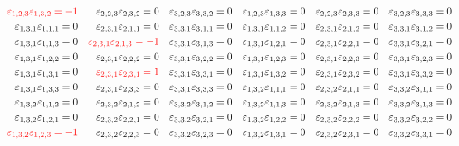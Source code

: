 \documentclass[12pt]{article}
\begin{document}
\begin{equation}
\begin{aligned}
&&{\color{red}\varepsilon_{1,2,3}\varepsilon_{1,3,2}=-1}
&&\varepsilon_{2,2,3}\varepsilon_{2,3,2}=0&&\varepsilon_{3,2,3}\varepsilon_{3,3,2}=0&&\varepsilon_{1,2,3}\varepsilon_{1,3,3}=0&&\varepsilon_{2,2,3}\varepsilon_{2,3,3}=0&&\varepsilon_{3,2,3}\varepsilon_{3,3,3}=0\\
&&\varepsilon_{1,3,1}\varepsilon_{1,1,1}=0&&\varepsilon_{2,3,1}\varepsilon_{2,1,1}=0&&\varepsilon_{3,3,1}\varepsilon_{3,1,1}=0&&\varepsilon_{1,3,1}\varepsilon_{1,1,2}=0&&\varepsilon_{2,3,1}\varepsilon_{2,1,2}=0&&\varepsilon_{3,3,1}\varepsilon_{3,1,2}=0\\
&&\varepsilon_{1,3,1}\varepsilon_{1,1,3}=0&&{\color{red}\varepsilon_{2,3,1}\varepsilon_{2,1,3}=-1}
&&\varepsilon_{3,3,1}\varepsilon_{3,1,3}=0&&\varepsilon_{1,3,1}\varepsilon_{1,2,1}=0&&\varepsilon_{2,3,1}\varepsilon_{2,2,1}=0&&\varepsilon_{3,3,1}\varepsilon_{3,2,1}=0\\
&&\varepsilon_{1,3,1}\varepsilon_{1,2,2}=0&&\varepsilon_{2,3,1}\varepsilon_{2,2,2}=0&&\varepsilon_{3,3,1}\varepsilon_{3,2,2}=0&&\varepsilon_{1,3,1}\varepsilon_{1,2,3}=0&&\varepsilon_{2,3,1}\varepsilon_{2,2,3}=0&&\varepsilon_{3,3,1}\varepsilon_{3,2,3}=0\\
&&\varepsilon_{1,3,1}\varepsilon_{1,3,1}=0&&{\color{red}\varepsilon_{2,3,1}\varepsilon_{2,3,1}=1}
&&\varepsilon_{3,3,1}\varepsilon_{3,3,1}=0&&\varepsilon_{1,3,1}\varepsilon_{1,3,2}=0&&\varepsilon_{2,3,1}\varepsilon_{2,3,2}=0&&\varepsilon_{3,3,1}\varepsilon_{3,3,2}=0\\
&&\varepsilon_{1,3,1}\varepsilon_{1,3,3}=0&&\varepsilon_{2,3,1}\varepsilon_{2,3,3}=0&&\varepsilon_{3,3,1}\varepsilon_{3,3,3}=0&&\varepsilon_{1,3,2}\varepsilon_{1,1,1}=0&&\varepsilon_{2,3,2}\varepsilon_{2,1,1}=0&&\varepsilon_{3,3,2}\varepsilon_{3,1,1}=0\\
&&\varepsilon_{1,3,2}\varepsilon_{1,1,2}=0&&\varepsilon_{2,3,2}\varepsilon_{2,1,2}=0&&\varepsilon_{3,3,2}\varepsilon_{3,1,2}=0&&\varepsilon_{1,3,2}\varepsilon_{1,1,3}=0&&\varepsilon_{2,3,2}\varepsilon_{2,1,3}=0&&\varepsilon_{3,3,2}\varepsilon_{3,1,3}=0\\
&&\varepsilon_{1,3,2}\varepsilon_{1,2,1}=0&&\varepsilon_{2,3,2}\varepsilon_{2,2,1}=0&&\varepsilon_{3,3,2}\varepsilon_{3,2,1}=0&&\varepsilon_{1,3,2}\varepsilon_{1,2,2}=0&&\varepsilon_{2,3,2}\varepsilon_{2,2,2}=0&&\varepsilon_{3,3,2}\varepsilon_{3,2,2}=0\\
&&{\color{red}\varepsilon_{1,3,2}\varepsilon_{1,2,3}=-1}
&&\varepsilon_{2,3,2}\varepsilon_{2,2,3}=0&&\varepsilon_{3,3,2}\varepsilon_{3,2,3}=0&&\varepsilon_{1,3,2}\varepsilon_{1,3,1}=0&&\varepsilon_{2,3,2}\varepsilon_{2,3,1}=0&&\varepsilon_{3,3,2}\varepsilon_{3,3,1}=0\\

\end{aligned}
\end{equation}
\end{document}
